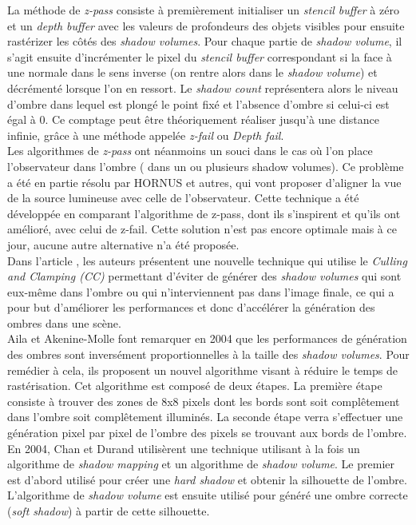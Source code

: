 \documentclass[a4paper,10pt]{report}
\begin{document}
La méthode de \textit{z-pass} consiste à premièrement initialiser un \textit{stencil buffer} à zéro et un \textit{depth buffer} avec les valeurs de profondeurs des objets visibles pour ensuite rastérizer les côtés des \textit{shadow volumes}. Pour chaque partie de \textit{shadow volume}, il s'agit ensuite d'incrémenter le pixel du \textit{stencil buffer} correspondant si la face à une normale dans le sens inverse (on rentre alors dans le \textit{shadow volume}) et décrémenté lorsque l'on en ressort. Le \textit{shadow count} représentera alors le niveau d'ombre dans lequel est plongé le point fixé et l'absence d'ombre si celui-ci est égal à 0.\cite{surveyofshadowalgorithms} Ce comptage peut être théoriquement réaliser jusqu'à une distance infinie, grâce à une méthode appelée \textit{z-fail} ou \textit{Depth fail}\cite{bilodeau1999real, carmack2000z}.
\\

Les algorithmes de \textit{z-pass} ont néanmoins un souci dans le cas où l'on place l'observateur dans l'ombre ( dans un ou plusieurs shadow volumes). Ce problème a été en partie résolu par HORNUS et autres\cite{hornus2005zp+}, qui vont proposer d'aligner la vue de la source lumineuse avec celle de l'observateur. Cette technique a été développée en comparant l'algorithme de z-pass, dont ils s'inspirent et qu'ils ont amélioré, avec celui de z-fail. Cette solution n'est pas encore optimale mais à ce jour, aucune autre alternative n'a été proposée.
\\

Dans l'article \cite{lloyd2004cc}, les auteurs présentent une nouvelle technique qui utilise le \textit{Culling and Clamping (CC)} permettant d'éviter de générer des \textit{shadow volumes} qui sont eux-même dans l'ombre ou qui n'interviennent pas dans l'image finale, ce qui a pour but d'améliorer les performances et donc d'accélérer la génération des ombres dans une scène.
\\

Aila et Akenine-Molle font remarquer en 2004 \cite{aila2004hierarchical} que les performances de génération des ombres sont inversément proportionnelles à la taille des \textit{shadow volumes}. Pour remédier à cela, ils proposent un nouvel algorithme visant à réduire le temps de rastérisation. Cet algorithme est composé de deux étapes. La première étape consiste à trouver des zones de 8x8 pixels dont les bords sont soit complêtement dans l'ombre soit complêtement illuminés. La seconde étape verra s'effectuer une génération pixel par pixel de l'ombre des pixels se trouvant aux bords de l'ombre.
\\
En 2004, Chan et Durand\cite{chan2004efficient} utilisèrent une technique utilisant à la fois un algorithme de \textit{shadow mapping} et un algorithme de \textit{shadow volume}. Le premier est d'abord utilisé pour créer une \textit{hard shadow} et obtenir la silhouette de l'ombre. L'algorithme de \textit{shadow volume} est ensuite utilisé pour généré une ombre correcte (\textit{soft shadow}) à partir de cette silhouette.
\end{document}
